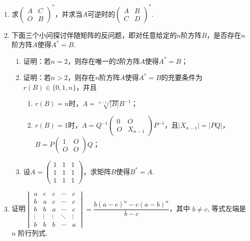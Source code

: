\begin{enumerate}
    \item 求$\begin{pmatrix}
                  A & C \\ O & B
              \end{pmatrix}^*$，并求当$A$可逆时的$\begin{pmatrix}
                  A & B \\ C & D
              \end{pmatrix}^*$.

    \item 下面三个小问探讨伴随矩阵的反问题，即对任意给定的$n$阶方阵$B$，是否存在$n$阶方阵$A$使得$A^*=B$.
          \begin{enumerate}
              \item 证明：若$n=2$，则存在唯一的2阶方阵$A$使得$A^*=B$；

              \item 证明：若$n > 2$，则存在$n$阶方阵$A$使得$A^*=B$的充要条件为$r(B) \in \{0,1,n\}$，并且
                    \begin{enumerate}
                        \item $r(B)=n$时，$A=\sqrt[n-1]{|B|}B^{-1}$；

                        \item $r(B)=1$时，$A=Q^{-1}\begin{pmatrix}
                                      0 & O \\ O & X_{n-1}
                                  \end{pmatrix}P^{-1}$，且$|X_{n-1}|=|PQ|$，$B=P\begin{pmatrix}
                                      1 & O \\ O & O
                                  \end{pmatrix}Q$；
                    \end{enumerate}

              \item 设$A=\begin{pmatrix}
                            1 & 1 & 1 \\ 1 & 1 & 1 \\ 1 & 1 & 1
                        \end{pmatrix}$，求矩阵$B$使得$B^*=A$.
          \end{enumerate}

    \item 证明$\begin{vmatrix}
        a      & c      & c      & \cdots & c      \\
        b      & a      & c      & \cdots & c      \\
        b      & b      & a      & \cdots & c      \\
        \vdots & \vdots & \vdots & \ddots & \vdots \\
        b      & b      & b      & \cdots & a
    \end{vmatrix}=\dfrac{b(a-c)^{n}-c(a-b)^{n}}{b-c}$，其中 $b \neq c$, 等式左端是 $n$ 阶行列式.
\end{enumerate}
